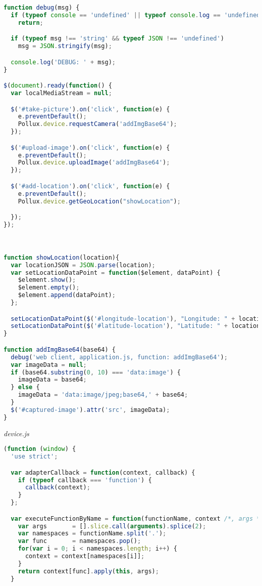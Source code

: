 \begin{appendices}
\begin{lstlisting}[language=JavaScript]
function debug(msg) {
  if (typeof console == 'undefined' || typeof console.log == 'undefined')
    return;

  if (typeof msg !== 'string' && typeof JSON !== 'undefined')
    msg = JSON.stringify(msg);

  console.log('DEBUG: ' + msg);
}

$(document).ready(function() {
  var localMediaStream = null;

  $('#take-picture').on('click', function(e) {
    e.preventDefault();
    Pollux.device.requestCamera('addImgBase64');
  });

  $('#upload-image').on('click', function(e) {
    e.preventDefault();
    Pollux.device.uploadImage('addImgBase64');
  });

  $('#add-location').on('click', function(e) {
    e.preventDefault();
    Pollux.device.getGeoLocation("showLocation");

  });
});



function showLocation(location){
  var locationJSON = JSON.parse(location);
  var setLocationDataPoint = function($element, dataPoint) {
    $element.show();
    $element.empty();
    $element.append(dataPoint);
  };

  setLocationDataPoint($('#longitude-location'), "Longitude: " + locationJSON.longitude);
  setLocationDataPoint($('#latitude-location'), "Latitude: " + locationJSON.latitude);
}

function addImgBase64(base64) {
  debug('web client, application.js, function: addImgBase64');
  var imageData = null;
  if (base64.substring(0, 10) === 'data:image') {
    imageData = base64;
  } else {
    imageData = 'data:image/jpeg;base64,' + base64;
  }
  $('#captured-image').attr('src', imageData);
}
\end{lstlisting}
\emph{device.js}
\begin{lstlisting}[language=JavaScript]
(function (window) {
  'use strict';

  var adapterCallback = function(context, callback) {
    if (typeof callback === 'function') {
      callback(context);
    }
  };

  var executeFunctionByName = function(functionName, context /*, args */) {
    var args       = [].slice.call(arguments).splice(2);
    var namespaces = functionName.split('.');
    var func       = namespaces.pop();
    for(var i = 0; i < namespaces.length; i++) {
      context = context[namespaces[i]];
    }
    return context[func].apply(this, args);
  }


\end{lstlisting}
\end{appendices}
